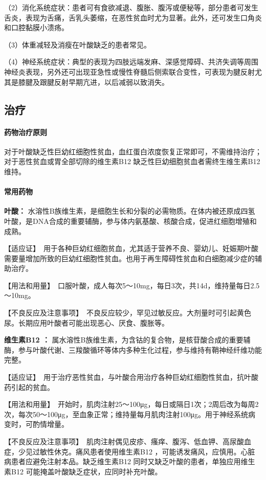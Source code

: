 （2）消化系统症状：患者可有食欲减退、腹胀、腹泻或便秘等，部分患者可发生舌炎，表现为舌痛，舌乳头萎缩，在恶性贫血时尤为显著。此外，还可发生口角炎和口腔黏膜小溃疡。

（3）体重减轻及消瘦在叶酸缺乏的患者常见。

（4）神经系统症状：典型的表现为四肢远端发麻、深感觉障碍、共济失调等周围神经炎表现，另外还可出现亚急性或慢性脊髓后侧索联合变性，可表现为腱反射尤其是膝腱及跟腱反射早期亢进，以后减弱以致消失。

\subsection{治疗}
\paragraph{药物治疗原则}

对于叶酸缺乏性巨幼红细胞性贫血，血红蛋白浓度恢复正常即可，不需维持治疗；对于恶性贫血或胃全部切除的维生素B{12}
缺乏性巨幼细胞贫血者需终生维生素B{12} 维持。
\paragraph{常用药物}

\textbf{叶酸：}
水溶性B族维生素，是细胞生长和分裂的必需物质。在体内被还原成四氢叶酸，是DNA合成的重要辅酶，参与体内氨基酸、核酸合成，促进红细胞增殖和成熟。

【适应证】　用于各种巨幼红细胞贫血，尤其适于营养不良、婴幼儿、妊娠期叶酸需要量增加所致的巨幼红细胞性贫血。也用于再生障碍性贫血和白细胞减少症的辅助治疗。

【用法和用量】　口服叶酸，成人每次5～10mg，每日3次，共14d，维持量每日2.5～10mg。

【不良反应及注意事项】　不良反应较少，罕见过敏反应。大剂量时可引起黄色尿。长期应用叶酸者可能出现恶心、厌食、腹胀等。

\textbf{维生素B{12} ：}
属水溶性B族维生素，为含钴的复合物，是核苷酸合成的重要辅酶，参与叶酸代谢、三羧酸循环等体内多种生化过程，参与维持有鞘神经纤维功能完整。

【适应证】　用于治疗恶性贫血，与叶酸合用治疗各种巨幼红细胞性贫血，抗叶酸药引起的贫血。

【用法和用量】　开始时，肌肉注射25～100μg，每日或隔日1次；2周后改为每周2次，每次50～100μg，至血象正常；维持量每月肌肉注射100μg。用于神经系统病变时，可酌情增量。

【不良反应及注意事项】　肌肉注射偶见皮疹、瘙痒、腹泻、低血钾、高尿酸血症，少见过敏性休克。痛风患者使用维生素B{12}
，可能诱发痛风，应慎用。心脏病患者应避免注射本品。缺乏维生素B{12}
同时又缺乏叶酸的患者，单独应用维生素B{12}
可能掩盖叶酸缺乏症状，应同时补充叶酸。

